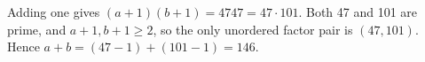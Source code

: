 Adding one gives $(a+1)(b+1)=4747=47\cdot101$. Both 47 and 101 are prime, and $a+1,b+1\ge2$, so the only unordered factor pair is $(47,101)$. Hence $a+b=(47-1)+(101-1)=\boxed{146}$.

